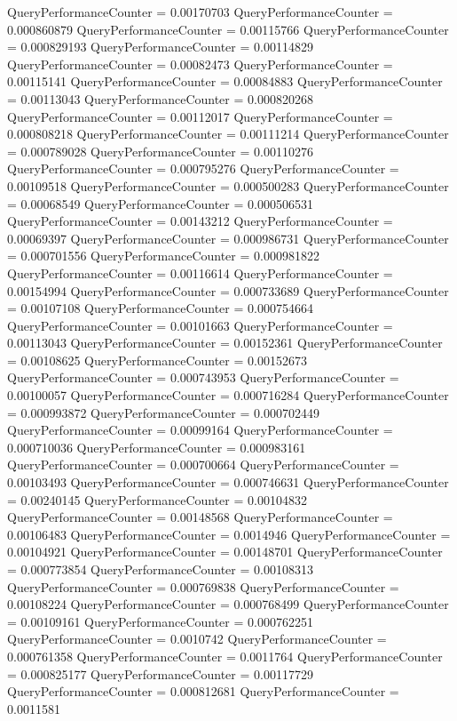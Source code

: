 \documentclass[9pt]{article}
\theoremstyle{plain}
\theoremstyle{definition}
\theoremstyle{remark}
\numberwithin{equation}{section}
\begin{document}
QueryPerformanceCounter  =  0.00170703
QueryPerformanceCounter  =  0.000860879
QueryPerformanceCounter  =  0.00115766
QueryPerformanceCounter  =  0.000829193
QueryPerformanceCounter  =  0.00114829
QueryPerformanceCounter  =  0.00082473
QueryPerformanceCounter  =  0.00115141
QueryPerformanceCounter  =  0.00084883
QueryPerformanceCounter  =  0.00113043
QueryPerformanceCounter  =  0.000820268
QueryPerformanceCounter  =  0.00112017
QueryPerformanceCounter  =  0.000808218
QueryPerformanceCounter  =  0.00111214
QueryPerformanceCounter  =  0.000789028
QueryPerformanceCounter  =  0.00110276
QueryPerformanceCounter  =  0.000795276
QueryPerformanceCounter  =  0.00109518
QueryPerformanceCounter  =  0.000500283
QueryPerformanceCounter  =  0.00068549
QueryPerformanceCounter  =  0.000506531
QueryPerformanceCounter  =  0.00143212
QueryPerformanceCounter  =  0.00069397
QueryPerformanceCounter  =  0.000986731
QueryPerformanceCounter  =  0.000701556
QueryPerformanceCounter  =  0.000981822
QueryPerformanceCounter  =  0.00116614
QueryPerformanceCounter  =  0.00154994
QueryPerformanceCounter  =  0.000733689
QueryPerformanceCounter  =  0.00107108
QueryPerformanceCounter  =  0.000754664
QueryPerformanceCounter  =  0.00101663
QueryPerformanceCounter  =  0.00113043
QueryPerformanceCounter  =  0.00152361
QueryPerformanceCounter  =  0.00108625
QueryPerformanceCounter  =  0.00152673
QueryPerformanceCounter  =  0.000743953
QueryPerformanceCounter  =  0.00100057
QueryPerformanceCounter  =  0.000716284
QueryPerformanceCounter  =  0.000993872
QueryPerformanceCounter  =  0.000702449
QueryPerformanceCounter  =  0.00099164
QueryPerformanceCounter  =  0.000710036
QueryPerformanceCounter  =  0.000983161
QueryPerformanceCounter  =  0.000700664
QueryPerformanceCounter  =  0.00103493
QueryPerformanceCounter  =  0.000746631
QueryPerformanceCounter  =  0.00240145
QueryPerformanceCounter  =  0.00104832
QueryPerformanceCounter  =  0.00148568
QueryPerformanceCounter  =  0.00106483
QueryPerformanceCounter  =  0.0014946
QueryPerformanceCounter  =  0.00104921
QueryPerformanceCounter  =  0.00148701
QueryPerformanceCounter  =  0.000773854
QueryPerformanceCounter  =  0.00108313
QueryPerformanceCounter  =  0.000769838
QueryPerformanceCounter  =  0.00108224
QueryPerformanceCounter  =  0.000768499
QueryPerformanceCounter  =  0.00109161
QueryPerformanceCounter  =  0.000762251
QueryPerformanceCounter  =  0.0010742
QueryPerformanceCounter  =  0.000761358
QueryPerformanceCounter  =  0.0011764
QueryPerformanceCounter  =  0.000825177
QueryPerformanceCounter  =  0.00117729
QueryPerformanceCounter  =  0.000812681
QueryPerformanceCounter  =  0.0011581
\end{document}

